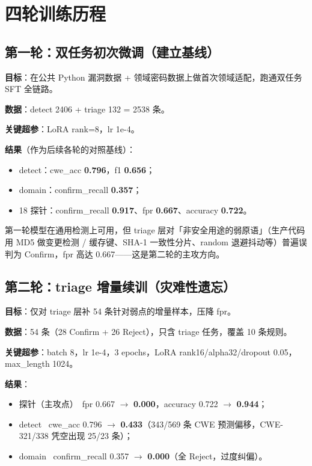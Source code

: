 \documentclass[UTF8,11pt]{ctexart}
\newcommand{\good}{\textcolor{green!50!black}{\checkmark}}
\newcommand{\bad}{\textcolor{red!70!black}{\texttimes}}
\begin{document}
\section{四轮训练历程}
\label{sec:rounds}

\subsection{第一轮：双任务初次微调（建立基线）}

\textbf{目标}：在公共 Python 漏洞数据 + 领域密码数据上做首次领域适配，跑通双任务 SFT 全链路。

\textbf{数据}：detect 2406 + triage 132 = 2538 条。

\textbf{关键超参}：LoRA rank=8，lr 1e-4。

\textbf{结果}（作为后续各轮的对照基线）：

\begin{itemize}
  \item detect：cwe\_acc \textbf{0.796}，f1 \textbf{0.656}；
  \item domain：confirm\_recall \textbf{0.357}；
  \item 18 探针：confirm\_recall \textbf{0.917}、fpr \textbf{0.667}、accuracy \textbf{0.722}。
\end{itemize}

第一轮模型在通用检测上可用，但 triage 层对「非安全用途的弱原语」（生产代码用 MD5 做变更检测 / 缓存键、SHA-1 一致性分片、random 退避抖动等）普遍误判为 Confirm，fpr 高达 0.667——这是第二轮的主攻方向。

\subsection{第二轮：triage 增量续训（灾难性遗忘）}

\textbf{目标}：仅对 triage 层补 54 条针对弱点的增量样本，压降 fpr。

\textbf{数据}：54 条（28 Confirm + 26 Reject），只含 triage 任务，覆盖 10 条规则。

\textbf{关键超参}：batch 8，lr 1e-4，3 epochs，LoRA rank16/alpha32/dropout 0.05，max\_length 1024。

\textbf{结果}：

\begin{itemize}
  \item 探针（主攻点）\good\ fpr 0.667 $\rightarrow$ \textbf{0.000}，accuracy 0.722 $\rightarrow$ \textbf{0.944}；
  \item detect \bad\ cwe\_acc 0.796 $\rightarrow$ \textbf{0.433}（343/569 条 CWE 预测偏移，CWE-321/338 凭空出现 25/23 条）；
  \item domain \bad\ confirm\_recall 0.357 $\rightarrow$ \textbf{0.000}（全 Reject，过度纠偏）。
\end{itemize}
\end{document}
